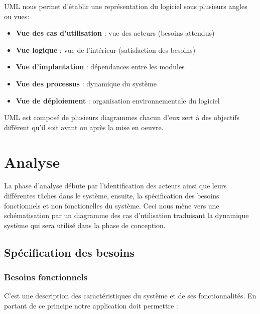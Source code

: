 UML nous permet d'établir une représentation du logiciel sous plusieurs angles ou vues:

\begin{itemize}
    \item \textbf{Vue des cas d’utilisation} : vue des acteurs (besoins attendus)
    \item \textbf{Vue logique} : vue de l'intérieur (satisfaction des besoins)
    \item \textbf{Vue d’implantation} : dépendances entre les modules
    \item \textbf{Vue des processus} : dynamique du système
    \item \textbf{Vue de déploiement} : organisation environnementale du logiciel
\end{itemize}

UML est composé de plusieurs diagrammes chacun d'eux sert à des objectifs différent qu'il soit avant ou après la mise en oeuvre.

\section{Analyse}
La phase d’analyse débute par l'identification des acteurs ainsi que leurs différentes tâches dans le système, ensuite, la spécification des besoins fonctionnels et non fonctionelles du système. Ceci nous mène vers une schématisation par un diagramme des cas d’utilisation traduisant la dynamique système qui sera utilisé dans la phase de conception.


\subsection{Spécification des besoins}
\subsubsection{Besoins fonctionnels}
C’est une description des caractéristiques du système et de ses fonctionnalités. En partant de ce principe notre application doit permettre :\\

